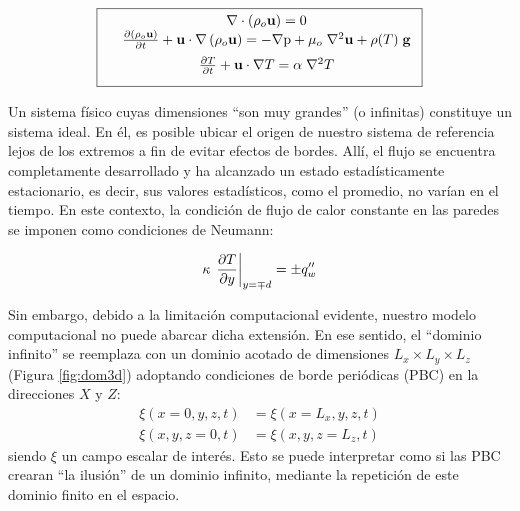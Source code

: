 \begin{equation}
        \boxed{ \begin{array}{lcc}
              &  \nabla \cdot \left( \rho_o \mathbf{u} \right) = 0 \\
              \vspace*{2mm}
              &  \frac{\partial \left( \rho_o \mathbf{u} \right)}{\partial t} + \mathbf{u} \cdot \nabla  \left( \rho_o \mathbf{u} \right) = -\nabla \text{p} + \mu_o \hspace{1mm} {\nabla}^2 \mathbf{u}  + \rho(T) \hspace{1mm} \mathbf{g} \\
              \vspace*{2mm}
              &  \frac{\partial T}{\partial t} + \mathbf{u} \cdot \nabla T =  \alpha \hspace{1mm} \nabla^2 T  \\
             \end{array}
               }
             \label{eq:gob_system}
\end{equation}

Un sistema físico cuyas dimensiones ``son muy grandes'' (o infinitas) constituye un sistema ideal. En él, es posible ubicar el origen de nuestro sistema de referencia lejos de los extremos a fin de evitar efectos de bordes. Allí, el flujo se encuentra completamente desarrollado y ha alcanzado un estado estadísticamente estacionario, es decir, sus valores estadísticos, como el promedio, no varían en el tiempo. En este contexto, la condición de flujo de calor constante en las paredes se imponen como condiciones de Neumann:

\begin{equation}
\kappa \hspace{0.5mm} \left. \frac{\partial T}{\partial y} \right\vert_{y=\mp d} = \pm q''_w
\label{eq:neumann}
\end{equation}

Sin embargo, debido a la limitación computacional evidente, nuestro modelo computacional no puede abarcar dicha extensión. En ese sentido, el ``dominio infinito'' se reemplaza con un dominio acotado de dimensiones $L_x \times L_y \times L_z$ (Figura \ref{fig:dom3d}) adoptando condiciones de borde periódicas (PBC) en la direcciones $X$ y $Z$:
\begin{align}
\xi(x=0,y,z,t) &= \xi(x=L_x,y,z,t) \\ 
\xi(x,y,z=0,t) &= \xi(x,y,z=L_z,t)
\end{align}
siendo $\xi$ un campo escalar de interés. Esto se puede interpretar como si las PBC crearan ``la ilusión'' de un dominio infinito, mediante la repetición de este dominio finito en el espacio.

